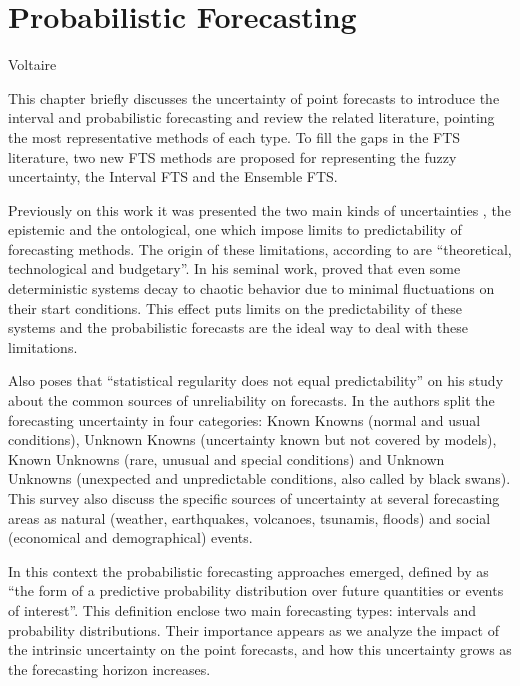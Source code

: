 \chapter[Probabilistic Forecasting]{Probabilistic Forecasting} 
\label{chap:review_probforecasting} 
\label{chap:prob}

{Voltaire}

This chapter briefly discusses the uncertainty of point forecasts to introduce the interval and probabilistic forecasting and review the related literature, pointing the most representative methods of each type. To fill the gaps in the FTS literature, two new FTS methods are proposed for representing the fuzzy uncertainty, the Interval FTS and the Ensemble FTS.

Previously on this work it was presented the two main kinds of uncertainties , the epistemic and the ontological, one which impose limits to predictability of forecasting methods. The origin of these limitations, according  to \cite{Krzysztofowicz2001} are ``theoretical, technological and budgetary''. In his seminal work, \cite{Lorenz1963} proved that even some deterministic systems decay to chaotic behavior due to minimal fluctuations on their start conditions. This effect puts limits on the predictability of these systems and the probabilistic forecasts are the ideal way to deal with these limitations. 

Also \cite{Makridakis2010} poses that ``statistical regularity does not equal predictability'' on his study about the common sources of unreliability on forecasts. In \cite{Makridakis2016} the authors split the forecasting uncertainty in four categories: Known Knowns (normal and usual conditions), Unknown Knowns (uncertainty known but not covered by models), Known Unknowns (rare, unusual and special conditions) and Unknown Unknowns (unexpected and unpredictable conditions, also called by black swans). This survey also discuss the specific sources of uncertainty at several forecasting areas as natural (weather, earthquakes, volcanoes, tsunamis, floods) and social (economical and demographical) events.

In this context the probabilistic forecasting approaches emerged, defined by \cite{Gneiting2014b} as ``the form of a predictive probability distribution over future quantities or events of interest''. This definition enclose two main forecasting types: intervals and probability distributions. Their importance appears as we analyze the impact of the intrinsic uncertainty on the point forecasts, and how this uncertainty grows as the forecasting horizon increases. 

